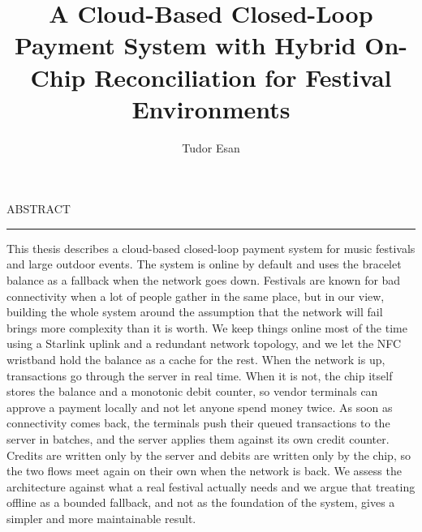 \documentclass[12pt]{report}
\begin{document}
\title{A Cloud-Based Closed-Loop Payment System with Hybrid On-Chip Reconciliation for Festival Environments}
\author{Tudor Esan}

\maketitle


\newpage
\thispagestyle{empty}
\mbox{}
\newpage
{}

\cleardoublepage
ABSTRACT
\vspace{0.5cm}
\hrule
\vspace{0.5cm}

This thesis describes a cloud-based closed-loop payment system for music festivals and large outdoor events. The system is online by default and uses the bracelet balance as a fallback when the network goes down. Festivals are known for bad connectivity when a lot of people gather in the same place, but in our view, building the whole system around the assumption that the network will fail brings more complexity than it is worth. We keep things online most of the time using a Starlink uplink and a redundant network topology, and we let the NFC wristband hold the balance as a cache for the rest. When the network is up, transactions go through the server in real time. When it is not, the chip itself stores the balance and a monotonic debit counter, so vendor terminals can approve a payment locally and not let anyone spend money twice. As soon as connectivity comes back, the terminals push their queued transactions to the server in batches, and the server applies them against its own credit counter. Credits are written only by the server and debits are written only by the chip, so the two flows meet again on their own when the network is back. We assess the architecture against what a real festival actually needs and we argue that treating offline as a bounded fallback, and not as the foundation of the system, gives a simpler and more maintainable result.

\tableofcontents


\newpage
{}

















\end{document}
